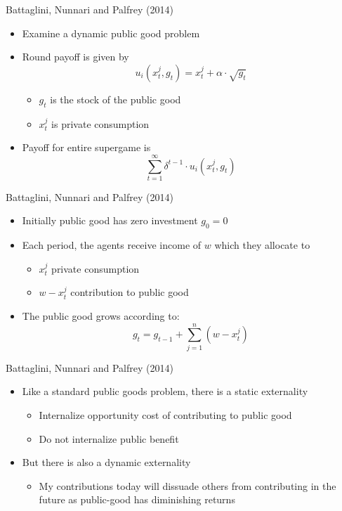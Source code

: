 \begin{frame}{Battaglini, Nunnari and Palfrey (2014)}
\begin{itemize}
\item Examine a dynamic public good problem 	\item Round payoff is given by 	$$ u_i(x^j_t,g_t)=x^j_t+\alpha \cdot \sqrt{g_t}$$ 	\begin{itemize} 	\item $g_t$ is the stock of the public good 	\item $x^j_t$ is private consumption 	\end{itemize} \pause 	\item Payoff for entire supergame is 	$$ \sum_{t=1}^{\infty} \delta^{t-1} \cdot u_i(x^j_t,g_t) $$ \end{itemize} \end{frame}
\begin{frame}{Battaglini, Nunnari and Palfrey (2014)} \begin{itemize} 	\item Initially public good has zero investment $g_0=0$ 	\item Each period, the agents receive income of $w$ which they allocate to 	\begin{itemize} 		\item $x^j_t$ private consumption 		\item $w-x^j_t$ contribution to public good 	\end{itemize}\pause 	\item The public good grows according to: 	$$ g_t=g_{t-1}+\sum^n_{j=1} (w-x^j_t)$$ \end{itemize} \end{frame}
\begin{frame}{Battaglini, Nunnari and Palfrey (2014)} 	\begin{itemize} 		\item Like a standard public goods problem, there is a static externality 		\begin{itemize} 			\item Internalize opportunity cost of contributing to public good 			\item Do not internalize public benefit 		\end{itemize}\pause 		\item But there is also a dynamic externality 		\begin{itemize} 			\item My contributions today will dissuade others from contributing in the future as public-good has diminishing returns 		\end{itemize} 	\end{itemize} \end{frame}
